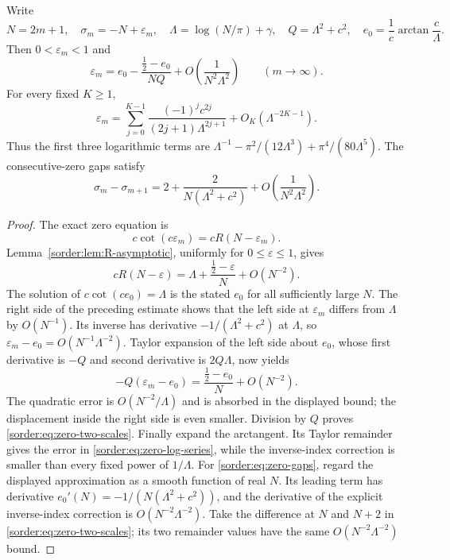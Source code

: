 \begin{theorem}\label{sorder:thm:zero-asymptotic}
Write
\[
 N=2m+1,\quad \sigma_m=-N+\varepsilon_m,\quad
 \Lambda=\log(N/\pi)+\gamma,\quad Q=\Lambda^2+c^2,
 \quad e_0=\frac1c\arctan\frac c\Lambda.
\]
Then $0<\varepsilon_m<1$ and
\begin{equation}\label{sorder:eq:zero-two-scales}
 \varepsilon_m=e_0-
       \frac{\tfrac12-e_0}{NQ}
       +O\left(\frac1{N^2\Lambda^2}\right)
       \qquad(m\to\infty).
\end{equation}
For every fixed $K\ge1$,
\begin{equation}\label{sorder:eq:zero-log-series}
 \varepsilon_m=
 \sum_{j=0}^{K-1}\frac{(-1)^jc^{2j}}{(2j+1)\Lambda^{2j+1}}
       +O_K(\Lambda^{-2K-1}).
\end{equation}
Thus the first three logarithmic terms are
$\Lambda^{-1}-\pi^2/(12\Lambda^3)+\pi^4/(80\Lambda^5)$.
The consecutive-zero gaps satisfy
\begin{equation}\label{sorder:eq:zero-gaps}
 \sigma_m-\sigma_{m+1}
 =2+\frac{2}{N(\Lambda^2+c^2)}
       +O\left(\frac1{N^2\Lambda^2}\right).
\end{equation}
\end{theorem}
\begin{proof}
The exact zero equation is
\begin{equation}\label{sorder:eq:epsilon-equation}
 c\cot(c\varepsilon_m)=cR(N-\varepsilon_m).
\end{equation}
Lemma~\ref{sorder:lem:R-asymptotic}, uniformly for $0\le\varepsilon\le1$,
gives
\[
 cR(N-\varepsilon)
 =\Lambda+\frac{\tfrac12-\varepsilon}{N}+O(N^{-2}).
\]
The solution of $c\cot(ce_0)=\Lambda$ is the stated $e_0$ for all
sufficiently large $N$. The right side of the preceding estimate
shows that the left side at $\varepsilon_m$ differs from $\Lambda$
by $O(N^{-1})$. Its inverse has derivative
$-1/(\Lambda^2+c^2)$ at $\Lambda$, so
$\varepsilon_m-e_0=O(N^{-1}\Lambda^{-2})$.
Taylor expansion of the left side about $e_0$, whose first derivative
is $-Q$ and second derivative is $2Q\Lambda$, now yields
\[
 -Q(\varepsilon_m-e_0)
 =\frac{\tfrac12-e_0}{N}+O(N^{-2}).
\]
The quadratic error is $O(N^{-2}/\Lambda)$ and is absorbed in the
displayed bound; the displacement inside the right side is even
smaller. Division by $Q$ proves \eqref{sorder:eq:zero-two-scales}.
Finally expand the arctangent. Its Taylor remainder gives the error
in \eqref{sorder:eq:zero-log-series}, while the inverse-index correction
is smaller than every fixed power of $1/\Lambda$.
For \eqref{sorder:eq:zero-gaps}, regard the displayed approximation
as a smooth function of real $N$. Its leading term has derivative
$e_0'(N)=-1/(N(\Lambda^2+c^2))$, and the derivative of the explicit
inverse-index correction is $O(N^{-2}\Lambda^{-2})$.
Take the difference at $N$ and $N+2$ in
\eqref{sorder:eq:zero-two-scales}; its two remainder values have the
same $O(N^{-2}\Lambda^{-2})$ bound.
\end{proof}

